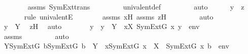 \begin{isabellebody}
\ \ \ \ \ \ \isamarkupfalse%
\ assms{}\ SymExt{\isacharunderscore}{\kern0pt}trans\ \isanewline
\ \ \ \ \ \ \isamarkupfalse%
\ univalent{\isacharunderscore}{\kern0pt}def\ \isanewline
\ \ \ \ \ \ \isamarkupfalse%
\ auto\isanewline
\isanewline
\ \ \ \ \isamarkupfalse%
\ {\isachardoublequoteopen}y\ {\isacharequal}{\kern0pt}\ z{\isachardoublequoteclose}\ \isanewline
\ \ \ \ \ \ \isamarkupfalse%
{\isacharparenleft}{\kern0pt}rule\ univalentE{\isacharparenright}{\kern0pt}\isanewline
\ \ \ \ \ \ \isamarkupfalse%
\ assms{}\ xH\ assms{}\ zH\ \isanewline
\ \ \ \ \ \ \isamarkupfalse%
\ auto\isanewline
\ \ \ \ \isamarkupfalse%
\ \isamarkupfalse%
\ {\isachardoublequoteopen}y\ {\isasymin}\ Y{\isachardoublequoteclose}\ \isamarkupfalse%
\ zH\ \isamarkupfalse%
\ auto\isanewline
\ \ \ \ \isamarkupfalse%
\ \isamarkupfalse%
\ {\isachardoublequoteopen}y\ {\isasymin}\ {\isacharbraceleft}{\kern0pt}y\ {\isasymin}\ Y\ {\isachardot}{\kern0pt}\ {\isasymexists}x{\isasymin}X{\isachardot}{\kern0pt}\ SymExt{\isacharparenleft}{\kern0pt}G{\isacharparenright}{\kern0pt}{\isacharcomma}{\kern0pt}\ {\isacharbrackleft}{\kern0pt}x{\isacharcomma}{\kern0pt}\ y{\isacharbrackright}{\kern0pt}\ {\isacharat}{\kern0pt}\ env\ {\isasymTurnstile}\ {\isasymphi}{\isacharbraceright}{\kern0pt}{\isachardoublequoteclose}\ \isanewline
\ \ \ \ \ \ \isamarkupfalse%
\ assms{}\ \isanewline
\ \ \ \ \ \ \isamarkupfalse%
\ auto\isanewline
\ \ \isamarkupfalse%
\isanewline
\ \ \isamarkupfalse%
\ \isamarkupfalse%
\ {\isachardoublequoteopen}{\isasymexists}Y{\isacharbrackleft}{\kern0pt}{\isacharhash}{\kern0pt}{\isacharhash}{\kern0pt}SymExt{\isacharparenleft}{\kern0pt}G{\isacharparenright}{\kern0pt}{\isacharbrackright}{\kern0pt}{\isachardot}{\kern0pt}\ {\isasymforall}b{\isacharbrackleft}{\kern0pt}{\isacharhash}{\kern0pt}{\isacharhash}{\kern0pt}SymExt{\isacharparenleft}{\kern0pt}G{\isacharparenright}{\kern0pt}{\isacharbrackright}{\kern0pt}{\isachardot}{\kern0pt}\ b\ {\isasymin}\ Y\ {\isasymlongleftrightarrow}\ {\isacharparenleft}{\kern0pt}{\isasymexists}x{\isacharbrackleft}{\kern0pt}{\isacharhash}{\kern0pt}{\isacharhash}{\kern0pt}SymExt{\isacharparenleft}{\kern0pt}G{\isacharparenright}{\kern0pt}{\isacharbrackright}{\kern0pt}{\isachardot}{\kern0pt}\ x\ {\isasymin}\ X\ {\isasymand}\ SymExt{\isacharparenleft}{\kern0pt}G{\isacharparenright}{\kern0pt}{\isacharcomma}{\kern0pt}\ {\isacharbrackleft}{\kern0pt}x{\isacharcomma}{\kern0pt}\ b{\isacharbrackright}{\kern0pt}\ {\isacharat}{\kern0pt}\ env\ {\isasymTurnstile}\ {\isasymphi}{\isacharparenright}{\kern0pt}{\isachardoublequoteclose}\ \isanewline

\end{isabellebody}

